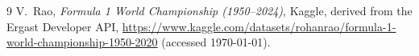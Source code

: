 \documentclass[11pt,a4paper]{article}
\begin{document}
\small
\begin{thebibliography}{9}\itemsep0pt
  V.~Rao, \emph{Formula 1 World Championship (1950--2024)}, Kaggle, derived from
  the Ergast Developer API,
  \url{https://www.kaggle.com/datasets/rohanrao/formula-1-world-championship-1950-2020}
  (accessed \today).
\end{thebibliography}
\end{document}
